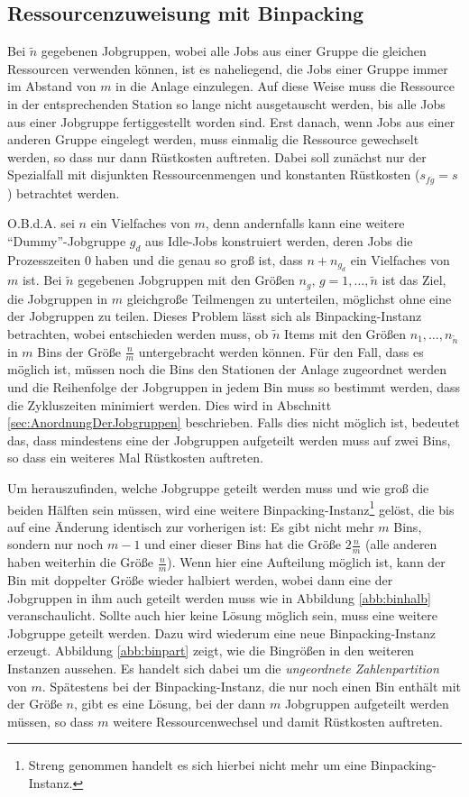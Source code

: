 \documentclass{scrreprt}
\begin{document}
\subsection{Ressourcenzuweisung mit Binpacking}
\label{subsec:RessourcenzuweisungMitBinpacking}
Bei $\tilde{n}$ gegebenen Jobgruppen, wobei alle Jobs aus einer Gruppe die gleichen Ressourcen verwenden können,
ist es naheliegend, die Jobs einer Gruppe immer im Abstand von $m$ in die Anlage einzulegen.
Auf diese Weise muss die Ressource in der entsprechenden Station so lange nicht ausgetauscht werden,
bis alle Jobs aus einer Jobgruppe fertiggestellt worden sind.
Erst danach, wenn Jobs aus einer anderen Gruppe eingelegt werden, muss einmalig die Ressource gewechselt werden,
so dass nur dann Rüstkosten auftreten.
Dabei soll zunächst nur der Spezialfall mit disjunkten Ressourcenmengen und konstanten Rüstkosten ($s_{fg}=s$) betrachtet werden.

O.B.d.A. sei $n$ ein Vielfaches von $m$, denn andernfalls kann eine weitere "`Dummy"'-Jobgruppe $g_d$ aus Idle-Jobs konstruiert werden,
deren Jobs die Prozesszeiten $0$ haben und die genau so groß ist, dass $n+n_{g_d}$ ein Vielfaches von $m$ ist.
Bei $\tilde{n}$ gegebenen Jobgruppen mit den Größen $n_g, \, g=1,\ldots,\tilde{n}$ ist das Ziel,
die Jobgruppen in $m$ gleichgroße Teilmengen zu unterteilen, möglichst ohne eine der Jobgruppen zu teilen.
Dieses Problem lässt sich als Binpacking-Instanz betrachten, wobei entschieden werden muss, ob $\tilde{n}$ Items 
mit den Größen $n_1,\ldots,n_{\tilde{n}}$ in $m$ Bins der Größe $\frac{n}{m}$ untergebracht werden können.
Für den Fall, dass es möglich ist, müssen noch die Bins den Stationen der Anlage zugeordnet werden und die Reihenfolge
der Jobgruppen in jedem Bin muss so bestimmt werden, dass die Zykluszeiten minimiert werden.
Dies wird in Abschnitt \ref{sec:AnordnungDerJobgruppen} beschrieben.
Falls dies nicht möglich ist, bedeutet das, dass mindestens eine der Jobgruppen aufgeteilt werden muss auf zwei Bins,
so dass ein weiteres Mal Rüstkosten auftreten.

Um herauszufinden, welche Jobgruppe geteilt werden muss und wie groß die beiden Hälften sein müssen,
wird eine weitere Binpacking-Instanz\footnote{Streng genommen handelt es sich hierbei nicht mehr um eine Binpacking-Instanz.} 
gelöst, die bis auf eine Änderung identisch zur vorherigen ist:
Es gibt nicht mehr $m$ Bins, sondern nur noch $m-1$ und einer dieser Bins hat die Größe $2\frac{n}{m}$ (alle anderen haben weiterhin die Größe $\frac{n}{m}$).
Wenn hier eine Aufteilung möglich ist, kann der Bin mit doppelter Größe wieder halbiert werden,
wobei dann eine der Jobgruppen in ihm auch geteilt werden muss wie in Abbildung \ref{abb:binhalb} veranschaulicht.
Sollte auch hier keine Lösung möglich sein, muss eine weitere Jobgruppe geteilt werden.
Dazu wird wiederum eine neue Binpacking-Instanz erzeugt.
Abbildung \ref{abb:binpart} zeigt, wie die Bingrößen in den weiteren Instanzen aussehen.
Es handelt sich dabei um die \textit{ungeordnete Zahlenpartition} von $m$.
Spätestens bei der Binpacking-Instanz, die nur noch einen Bin enthält mit der Größe $n$, gibt es eine Lösung,
bei der dann $m$ Jobgruppen aufgeteilt werden müssen, so dass $m$ weitere Ressourcenwechsel und damit Rüstkosten auftreten.
\end{document}
